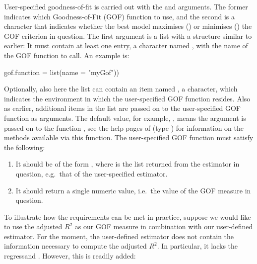 User-specified goodness-of-fit is carried out with the  and  arguments. The former indicates which Goodness-of-Fit (GOF) function to use, and the second is a character that indicates whether the best model maximises () or minimises () the GOF criterion in question. The first argument is a list with a structure similar to earlier: It must contain at least one entry, a character named , with the name of the GOF function to call. An example is:
%
\begin{example}
  gof.function = list(name = "myGof"))
\end{example}
%
Optionally, also here the list can contain an item named , a character, which indicates the environment in which the user-specified GOF function resides. Also as earlier, additional items in the list are passed on to the user-specified GOF function as arguments. The default value, for example, , means the argument  is passed on to the function , see the help pages of  (type ) for information on the methods available via this function. The user-specified GOF function must satisfy the following:
%
\begin{enumerate}
	\item It should be of the form , where  is the list returned from the estimator in question, e.g.\ that of the user-specified estimator.
	
	\item It should return a single numeric value, i.e.\ the value of the GOF measure in question. 
\end{enumerate}
%
To illustrate how the requirements can be met in practice, suppose we would like to use the adjusted $R^2$ as our GOF measure in combination with our user-defined estimator. For the moment, the user-defined estimator  does not contain the information necessary to compute the adjusted $R^2$. In particular, it lacks the regressand . However, this is readily added:
%
